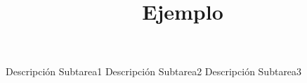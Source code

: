 \documentclass{oci}
\title{Ejemplo}
\begin{document}
\begin{problemDescription}

\end{problemDescription}

\begin{inputDescription}
\lipsum[1]
\end{inputDescription}

\begin{outputDescription}
\lipsum[1]
\end{outputDescription}

\begin{scoreDescription}
  Descripción Subtarea1
  Descripción Subtarea2
  Descripción Subtarea3
\end{scoreDescription}

\begin{sampleDescription}
\end{sampleDescription}
\end{document}
